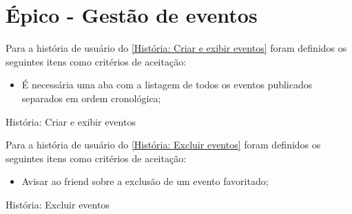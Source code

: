 \section{Épico - Gestão de eventos}
\label{gestão_eventos}
Para a história de usuário do \autoref{História: Criar e exibir eventos} foram definidos os seguintes itens como critérios de aceitação:

\begin{itemize}
\item É necessária uma aba com a listagem de todos os eventos publicados separados em ordem cronológica;
\end{itemize}

\def\arraystretch{2}
\begin{quadro}[htb]
\centering
\ABNTEXfontereduzida
\caption[História: Criar e exibir eventos]{História: Criar e exibir eventos}
\label{História: Criar e exibir eventos}
\end{quadro}
\FloatBarrier 

Para a história de usuário do \autoref{História: Excluir eventos} foram definidos os seguintes itens como critérios de aceitação:

\begin{itemize}
\item Avisar ao \gls{friend} sobre a exclusão de um evento favoritado;
\end{itemize}

\def\arraystretch{2}
\begin{quadro}[htb]
\centering
\ABNTEXfontereduzida
\caption[História: Excluir eventos]{História: Excluir eventos}
\label{História: Excluir eventos}
\end{quadro}
\FloatBarrier 

